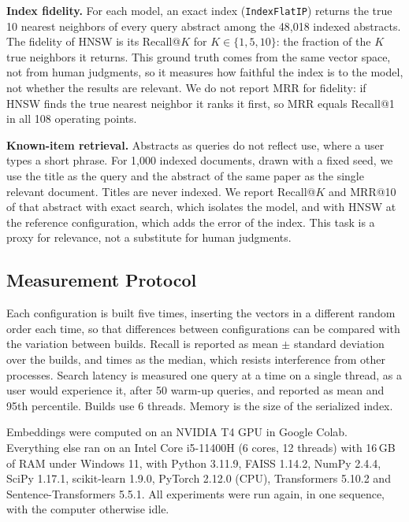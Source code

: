 \documentclass[runningheads]{llncs}
\begin{document}
\textbf{Index fidelity.} For each model, an exact index (\texttt{IndexFlatIP}) returns the
true 10 nearest neighbors of every query abstract among the 48,018 indexed abstracts. The
fidelity of HNSW is its Recall@$K$ for $K \in \{1,5,10\}$: the fraction of the $K$ true
neighbors it returns. This ground truth comes from the same vector space, not from human
judgments, so it measures how faithful the index is to the model, not whether the results
are relevant. We do not report MRR for fidelity: if HNSW finds the true nearest neighbor it
ranks it first, so MRR equals Recall@1 in all 108 operating points.

\textbf{Known-item retrieval.} Abstracts as queries do not reflect use, where a user types a
short phrase. For 1,000 indexed documents, drawn with a fixed seed, we use the title as the
query and the abstract of the same paper as the single relevant document. Titles are never
indexed. We report Recall@$K$ and MRR@10 \cite{ref16} of that abstract with exact search, which
isolates the model, and with HNSW at the reference configuration, which adds the error of
the index. This task is a proxy for relevance, not a substitute for human judgments.

\subsection{Measurement Protocol}

Each configuration is built five times, inserting the vectors in a different random order
each time, so that differences between configurations can be compared with the variation
between builds. Recall is reported as mean $\pm$ standard deviation over the builds, and
times as the median, which resists interference from other processes. Search latency is
measured one query at a time on a single thread, as a user would experience it, after 50
warm-up queries, and reported as mean and 95th percentile. Builds use 6 threads. Memory is
the size of the serialized index.

Embeddings were computed on an NVIDIA T4 GPU in Google Colab. Everything else ran on an
Intel Core i5-11400H (6 cores, 12 threads) with 16\,GB of RAM under Windows 11, with Python
3.11.9, FAISS 1.14.2, NumPy 2.4.4, SciPy 1.17.1, scikit-learn 1.9.0, PyTorch 2.12.0 (CPU),
Transformers 5.10.2 and Sentence-Transformers 5.5.1. All experiments were run again, in one
sequence, with the computer otherwise idle.
\end{document}
